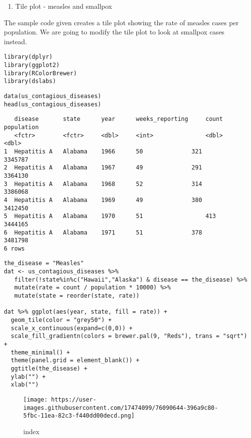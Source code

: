 \documentclass[]{article}
\providecommand{\tightlist}{%
  \setlength{\itemsep}{0pt}\setlength{\parskip}{0pt}}
\begin{document}
\begin{enumerate}
\def\labelenumi{\arabic{enumi}.}
\tightlist
\item
  Tile plot - measles and smallpox
\end{enumerate}

The sample code given creates a tile plot showing the rate of measles
cases per population. We are going to modify the tile plot to look at
smallpox cases instead.

\begin{verbatim}
library(dplyr)
library(ggplot2)
library(RColorBrewer)
library(dslabs)
\end{verbatim}

\begin{verbatim}
data(us_contagious_diseases)
head(us_contagious_diseases)
\end{verbatim}

\begin{verbatim}
   disease       state      year      weeks_reporting     count      population
   <fctr>        <fctr>     <dbl>     <int>               <dbl>      <dbl>
1  Hepatitis A   Alabama    1966      50              321        3345787
2  Hepatitis A   Alabama    1967      49              291        3364130
3  Hepatitis A   Alabama    1968      52              314        3386068
4  Hepatitis A   Alabama    1969      49              380        3412450
5  Hepatitis A   Alabama    1970      51                  413        3444165
6  Hepatitis A   Alabama    1971      51              378        3481798
6 rows
\end{verbatim}

\begin{verbatim}
the_disease = "Measles"
dat <- us_contagious_diseases %>% 
   filter(!state%in%c("Hawaii","Alaska") & disease == the_disease) %>% 
   mutate(rate = count / population * 10000) %>% 
   mutate(state = reorder(state, rate))

dat %>% ggplot(aes(year, state, fill = rate)) + 
  geom_tile(color = "grey50") + 
  scale_x_continuous(expand=c(0,0)) + 
  scale_fill_gradientn(colors = brewer.pal(9, "Reds"), trans = "sqrt") + 
  theme_minimal() + 
  theme(panel.grid = element_blank()) + 
  ggtitle(the_disease) + 
  ylab("") + 
  xlab("")
\end{verbatim}

\begin{figure}
\centering
\texttt{[image: https://user-images.githubusercontent.com/17474099/76090644-396a9c80-5fbc-11ea-82c3-f440dd00decd.png]}
\caption{index}
\end{figure}
\end{document}
